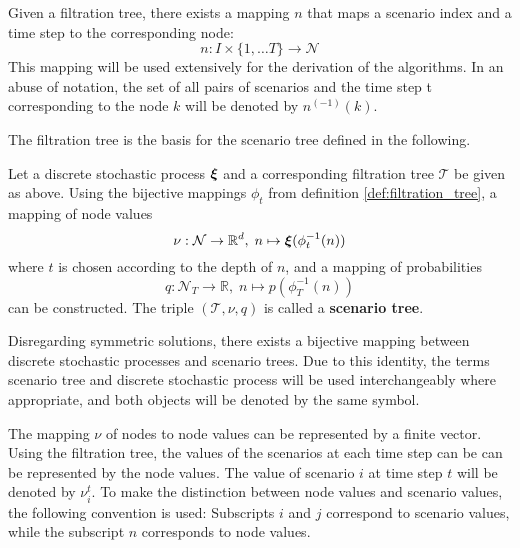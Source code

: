 \begin{remark}
  Given a filtration tree, there exists a mapping $n$ that maps a scenario index and a time step to the corresponding node:
  \begin{equation}
    \label{eq:71}
    n:I\times \{1,\ldots T\}\rightarrow\mathcal{N}
  \end{equation}
  This mapping will be used extensively for the derivation of the algorithms.
  In an abuse of notation, the set of all pairs of scenarios and the time step t corresponding to the node $k$ will be denoted by $n^{(-1)}(k)$.
\end{remark}
The filtration tree is the basis for the scenario tree defined in the following.
\begin{definition}
  Let a discrete stochastic process $\boldsymbol\xi$ and a corresponding filtration tree $\mathcal{T}$ be given as above.
  Using the bijective mappings $\phi_t$ from definition \ref{def:filtration_tree}, a mapping of node values
  \[
  \nu:\mathcal{N}\rightarrow\mathbb{R}^d,\; n\mapsto \boldsymbol\xi(\phi_t^{-1}(n))
  \]
  where $t$ is chosen according to the depth of $n$,
  and a mapping of probabilities
  \[
  q:\mathcal{N}_T\rightarrow\mathbb{R},\; n\mapsto p(\phi_T^{-1}(n))
  \]
  can be constructed.
  The triple $(\mathcal{T}, \nu, q)$ is called a \textbf{scenario tree}.
\end{definition}
Disregarding symmetric solutions, there exists a bijective mapping between discrete stochastic processes and scenario trees.
Due to this identity, the terms scenario tree and discrete stochastic process will be used interchangeably where appropriate, and both objects will be denoted by the same symbol.
\begin{remark}
The mapping $\nu$ of nodes to node values can be represented by a finite vector.
Using the filtration tree, the values of the scenarios at each time step can be can be represented by the node values.
The value of scenario $i$ at time step $t$ will be denoted by $\nu_i^t$. To make the distinction between node values and scenario values, the following convention is used: Subscripts $i$ and $j$ correspond to scenario values, while the subscript $n$ corresponds to node values.
\end{remark}

